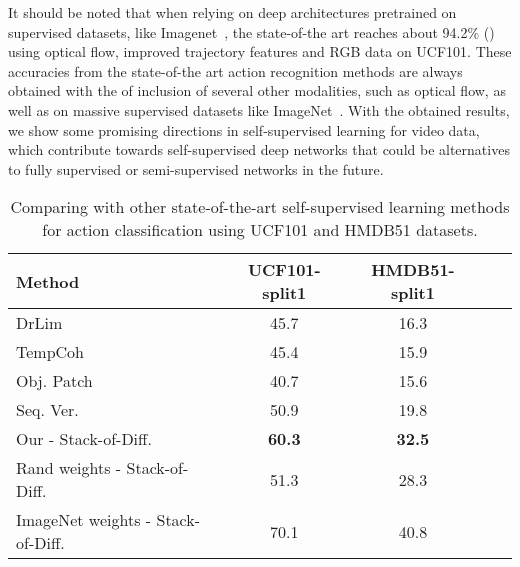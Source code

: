 It should be noted that when relying on deep architectures pretrained on supervised datasets, like Imagenet~\cite{Deng2009}, the state-of-the art reaches about 94.2\% (\cite{Wang2016}) using optical flow, improved trajectory features and RGB data on UCF101. 
These accuracies from the state-of-the art action recognition methods are always obtained with the of inclusion of several other modalities, such as optical flow, as well as on massive supervised datasets like ImageNet~\cite{Deng2009}.
With the obtained results, we show some promising directions in self-supervised learning for video data, which contribute towards self-supervised deep networks that could be alternatives to fully supervised or semi-supervised networks in the future.
\begin{table}[t]
\scriptsize
\begin{center}
\begin{tabular}{|l|c|c|c|c|}
\hline
Method 			  & UCF101-split1 	& HMDB51-split1\\ \hline \hline
DrLim~\cite{Hadsell2006}  &     45.7 		&   16.3  	 \\ \hline
TempCoh~\cite{Mobahi2009} &     45.4 		&   15.9  	  \\ \hline 
Obj. Patch~\cite{Wang2015}&     40.7 		&   15.6   	  \\ \hline
Seq. Ver.~\cite{Misra2016}&     50.9 		&   19.8   	  \\ \hline 
Our - Stack-of-Diff.	  &     \textbf{60.3}	&      \textbf{32.5} 	  \\ \hline  \hline
Rand weights - Stack-of-Diff. &     51.3		& 28.3 \\ \hline
ImageNet weights - Stack-of-Diff. &     70.1		& 40.8 \\ \hline
\end{tabular}
\end{center}
\caption{Comparing with other state-of-the-art self-supervised learning methods for action classification using UCF101 and HMDB51 datasets.}
\label{tbl.soa}
\end{table}